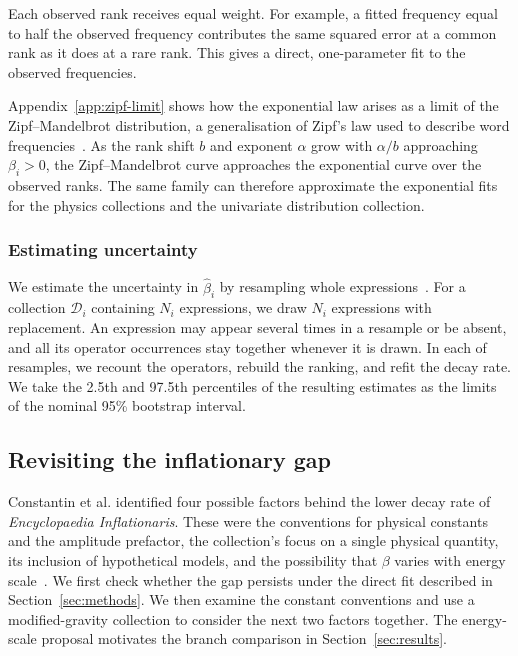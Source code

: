 \documentclass[10pt]{article}
\begin{document}
Each observed rank receives equal weight. For example, a fitted frequency equal to half the observed frequency contributes the same squared error at a common rank as it does at a rare rank. This gives a direct, one-parameter fit to the observed frequencies.

Appendix~\ref{app:zipf-limit} shows how the exponential law arises as a limit of the Zipf--Mandelbrot distribution, a generalisation of Zipf's law used to describe word frequencies~\citep{mandelbrot1953}. As the rank shift $b$ and exponent $\alpha$ grow with $\alpha/b$ approaching $\beta_i>0$, the Zipf--Mandelbrot curve approaches the exponential curve over the observed ranks. The same family can therefore approximate the exponential fits for the physics collections and the univariate distribution collection.

\subsubsection{Estimating uncertainty}

We estimate the uncertainty in $\hat{\beta}_i$ by resampling whole expressions~\citep{efron1979}. For a collection $\mathcal{D}_i$ containing $N_i$ expressions, we draw $N_i$ expressions with replacement. An expression may appear several times in a resample or be absent, and all its operator occurrences stay together whenever it is drawn. In each of \bootN{} resamples, we recount the operators, rebuild the ranking, and refit the decay rate. We take the 2.5th and 97.5th percentiles of the resulting estimates as the limits of the nominal 95\% bootstrap interval.

\subsection{Revisiting the inflationary gap}\label{sec:ei}

Constantin et al. identified four possible factors behind the lower decay rate of \textit{Encyclopaedia Inflationaris}. These were the conventions for physical constants and the amplitude prefactor, the collection's focus on a single physical quantity, its inclusion of hypothetical models, and the possibility that $\beta$ varies with energy scale~\citep{constantin2026}. We first check whether the gap persists under the direct fit described in Section~\ref{sec:methods}. We then examine the constant conventions and use a modified-gravity collection to consider the next two factors together. The energy-scale proposal motivates the branch comparison in Section~\ref{sec:results}.
\end{document}

